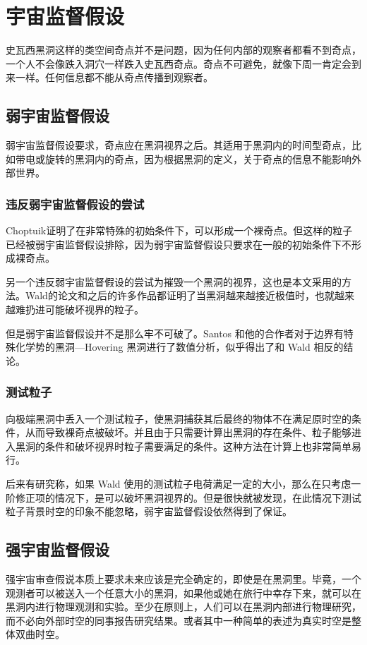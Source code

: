 \chapter{宇宙监督假设}
史瓦西黑洞这样的类空间奇点并不是问题，因为任何内部的观察者都看不到奇点，一个人不会像跌入洞穴一样跌入史瓦西奇点。奇点不可避免，就像下周一肯定会到来一样。任何信息都不能从奇点传播到观察者。
\section{弱宇宙监督假设}
弱宇宙监督假设要求，奇点应在黑洞视界之后。其适用于黑洞内的时间型奇点，比如带电或旋转的黑洞内的奇点，因为根据黑洞的定义，关于奇点的信息不能影响外部世界。
\subsection{违反弱宇宙监督假设的尝试}
Choptuik证明了在非常特殊的初始条件下\citep{choptuik1993universality}，可以形成一个裸奇点。但这样的粒子已经被弱宇宙监督假设排除，因为弱宇宙监督假设只要求在一般的初始条件下不形成裸奇点。

另一个违反弱宇宙监督假设的尝试为摧毁一个黑洞的视界，这也是本文采用的方法。Wald的论文\citep{wald1974gedanken}和之后的许多作品都证明了当黑洞越来越接近极值时，也就越来越难扔进可能破坏视界的粒子。

但是弱宇宙监督假设并不是那么牢不可破了。Santos 和他的合作者对于边界有特殊化学势的黑洞—Hovering 黑洞进行了数值分析\citep{horowitz2015hovering,crisford2017violating}，似乎得出了和 Wald 相反的结论。
\subsection{测试粒子}
向极端黑洞中丢入一个测试粒子，使黑洞捕获其后最终的物体不在满足原时空的条件，从而导致裸奇点被破坏。并且由于只需要计算出黑洞的存在条件、粒子能够进入黑洞的条件和破坏视界时粒子需要满足的条件。这种方法在计算上也非常简单易行。

后来有研究称，如果 Wald 使用的测试粒子电荷满足一定的大小，那么在只考虑一阶修正项的情况下，是可以破坏黑洞视界的\citep{hubeny1999overcharging}。但是很快就被发现，在此情况下测试粒子背景时空的印象不能忽略\citep{hod2002cosmic,barausse2010test,colleoni2015overspinning,wald2018kerr,sorce2017gedanken}，弱宇宙监督假设依然得到了保证。

\section{强宇宙监督假设}
强宇宙审查假说本质上要求未来应该是完全确定的，即使是在黑洞里。毕竟，一个观测者可以被送入一个任意大小的黑洞，如果他或她在旅行中幸存下来，就可以在黑洞内进行物理观测和实验。至少在原则上，人们可以在黑洞内部进行物理研究，而不必向外部时空的同事报告研究结果\citep{ong2020space}。或者其中一种简单的表述为真实时空是整体双曲时空。

